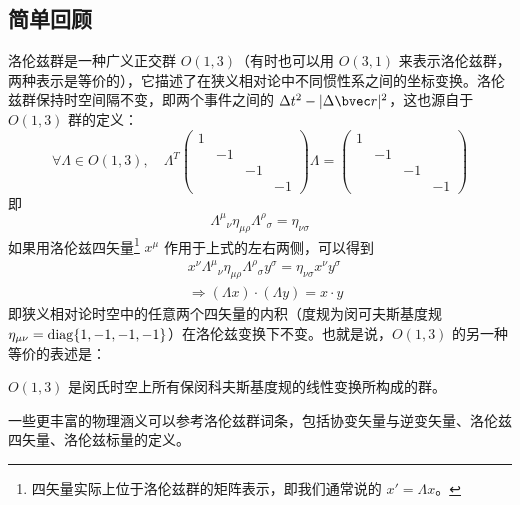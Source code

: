 

\subsection{简单回顾}
洛伦兹群是一种广义正交群 $O(1,3)$（有时也可以用 $O(3,1)$ 来表示洛伦兹群，两种表示是等价的），它描述了在狭义相对论中不同惯性系之间的坐标变换。洛伦兹群保持时空间隔不变，即两个事件之间的 $\Delta t^2-|\Delta \bvec r|^2$，这也源自于 $O(1,3)$ 群的定义：
\begin{equation}
\forall \Lambda \in O(1,3),\quad \Lambda^T \begin{pmatrix}
1&&&\\
&-1&&\\
&&-1&\\
&&&-1
\end{pmatrix}\Lambda =\begin{pmatrix}
1&&&\\
&-1&&\\
&&-1&\\
&&&-1
\end{pmatrix}
\end{equation}
即
\begin{equation}
\Lambda^\mu{}_{\nu} \eta_{\mu\rho}\Lambda^{\rho}{}_{\sigma}=\eta_{\nu\sigma}
\end{equation}
如果用洛伦兹四矢量\footnote{四矢量实际上位于洛伦兹群的矩阵表示，即我们通常说的 $x'=\Lambda x$。} $x^\mu$ 作用于上式的左右两侧，可以得到
\begin{equation}
\begin{aligned}
&x^\nu \Lambda^{\mu}{}_\nu \eta_{\mu\rho} \Lambda^\rho{}_\sigma y^\sigma=\eta_{\nu\sigma} x^\nu y^\sigma\\
&\Rightarrow (\Lambda x)\cdot (\Lambda y)=x\cdot y
\end{aligned}
\end{equation}
即狭义相对论时空中的任意两个四矢量的内积（度规为闵可夫斯基度规 $\eta_{\mu\nu}=\rm diag\{1,-1,-1,-1\}$）在洛伦兹变换下不变。也就是说，$O(1,3)$ 的另一种等价的表述是：
\begin{definition}{}
$O(1,3)$ 是闵氏时空上所有保闵科夫斯基度规的线性变换所构成的群。
\end{definition}
一些更丰富的物理涵义可以参考洛伦兹群词条，包括协变矢量与逆变矢量、洛伦兹四矢量、洛伦兹标量的定义。
